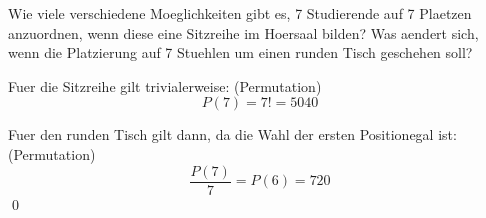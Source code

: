\documentclass{abgabe}
\begin{document}
\begin{questions}
    \question
    Wie viele verschiedene Moeglichkeiten gibt es, 7 Studierende auf 7 Plaetzen anzuordnen, wenn diese eine Sitzreihe im Hoersaal bilden?
    Was aendert sich, wenn die Platzierung auf 7 Stuehlen um einen runden Tisch geschehen soll?
    \begin{solution}
        Fuer die Sitzreihe gilt trivialerweise: (Permutation)
        \[
            P(7) = 7! = \num{5040}  
        \]

        Fuer den runden Tisch gilt dann, da die Wahl der \glqq ersten Position\grqq egal ist: (Permutation)
        \[
            \frac{P(7)}{7} = P(6) = 720
        \]\qed
    \end{solution}
\end{questions}
\end{document}
